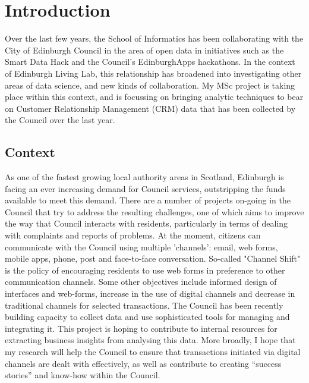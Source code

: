 
\chapter{Introduction}


Over the last few years, the School of Informatics has been collaborating with the City of Edinburgh Council in the area of open data in initiatives such as the Smart Data Hack and the Council's EdinburghApps hackathons. In the context of Edinburgh Living Lab, this relationship has broadened into investigating other areas of data science, and new kinds of collaboration. My MSc project is taking place within this context, and is focussing on bringing analytic techniques to bear on Customer Relationship Management (CRM) data that has been collected by the Council over the last year.

	\section{Context}

As one of the fastest growing local authority areas in Scotland, Edinburgh is facing an ever increasing demand for Council services, outstripping the funds available to meet this demand. There are a number of projects on-going in the Council that try to address the resulting challenges, one of which aims to improve the way that Council interacts with residents, particularly in terms of dealing with complaints and reports of problems. At the moment, citizens can communicate with the Council using multiple 'channels': email, web forms, mobile apps, phone, post and face-to-face conversation. So-called "Channel Shift" is the policy of encouraging residents to use web forms in preference to other communication channels. Some other objectives include informed design of interfaces and web-forms, increase in the use of digital channels and decrease in traditional channels for selected transactions. The Council has been recently building capacity to collect data and use sophisticated tools for managing and integrating it. This project is hoping to contribute to internal resources for extracting business insights from analysing this data. More broadly, I hope that my research will help the Council to ensure that transactions initiated via digital channels are dealt with effectively, as well as contribute to creating “success stories” and know-how within the Council.


